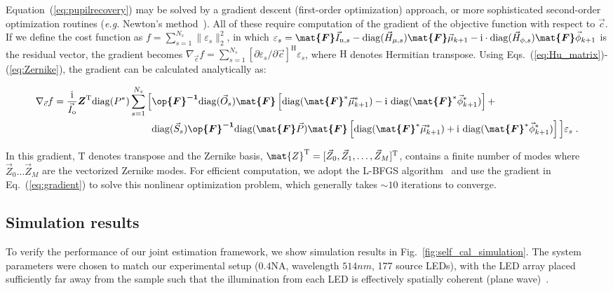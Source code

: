 \noindent Equation~({\ref{eq:pupilrecovery}}) may be solved by a gradient descent (first-order optimization) approach, or more sophisticated second-order optimization routines (\textit{e.g.} Newton's method~\cite{zhong2016nonlinear}). All of these require computation of the gradient of the objective function with respect to $\vec{c}$. If we define the cost function as $f = \sum_{s=1}^{N_{s}}\|\varepsilon_{s}\|^{2}_{2}$, in which $\varepsilon_{s} = \boldsymbol{\mat{F}}\vec{I}_{\mathrm{n},s}-\mathrm{diag}(\vec{H}_{\mu,s})\boldsymbol{\mat{F}}\vec{\mu}_{k+1}-\mathrm{i}\cdot\mathrm{diag}(\vec{H}_{\phi,s})\boldsymbol{\mat{F}}\vec{\phi}_{k+1}$ is the residual vector, the gradient becomes $\nabla_{\vec{c}} f =  \sum_{s=1}^{N_{s}}\left[\partial\varepsilon_{s}/\partial\vec{c}\right]^{\mathrm{H}}\varepsilon_{s}$, where $\mathrm{H}$ denotes Hermitian transpose. Using Eqs.~(\ref{eq:Hu_matrix})-(\ref{eq:Zernike}), the gradient can be calculated analytically as:

\begin{equation}
\label{eq:gradient}
\begin{split}
\nabla_{\vec{c}} f =  \frac{\mathrm{i}}{\vec{I}_{\mathrm{o}}}\boldsymbol{Z}^{\mathrm{T}}\mathrm{diag}(P^{*})\sum_{s=1}^{N_{s}} \Big[&\boldsymbol{\op{F}^{-1}}\mathrm{diag}(\vec{O}_{s})\boldsymbol{\mat{F}}\left[\mathrm{diag}(\boldsymbol{\mat{F}}^{*}\vec{\mu}^{*}_{k+1})-\mathrm{i}\ \mathrm{diag}(\boldsymbol{\mat{F}}^{*}\vec{\phi}^{*}_{k+1})\right]+\\
&\mathrm{diag}(\vec{S}_{s}) \boldsymbol{\op{F}^{-1}}\mathrm{diag}(\boldsymbol{\mat{F}}\vec{P})\boldsymbol{\mat{F}}\left[\mathrm{diag}(\boldsymbol{\mat{F}}^{*}\vec{\mu}^{*}_{k+1})+\mathrm{i}\ \mathrm{diag}(\boldsymbol{\mat{F}}^{*}\vec{\phi}^{*}_{k+1})\right]\Big]  \varepsilon_{s}\; .
\end{split}
\end{equation}

\noindent In this gradient, $\mathrm{T}$ denotes transpose and the Zernike basis, $\mat{Z}^{\mathrm{T}} = [\vec{Z}_{0},\vec{Z}_{1},\ldots,\vec{Z}_{M}]^{\mathrm{T}}$, contains a finite number of modes where $\vec{Z}_{0} \ldots \vec{Z}_{M}$ are the vectorized Zernike modes. For efficient computation, we adopt the L-BFGS algorithm~\cite{LBFGS} and use the gradient in Eq.~(\ref{eq:gradient}) to solve this nonlinear optimization problem, which generally takes $\sim10$ iterations to converge.

\subsection{Simulation results}
To verify the performance of our joint estimation framework, we show simulation results in Fig.~\ref{fig:self_cal_simulation}. The system parameters were chosen to match our experimental setup ($0.4 \mathrm{NA}$, wavelength $514nm$, 177 source LEDs), with the LED array placed sufficiently far away from the sample such that the illumination from each LED is effectively spatially coherent (plane wave)~\cite{Zheng2013,Ou:14,tian2015computational}. 

